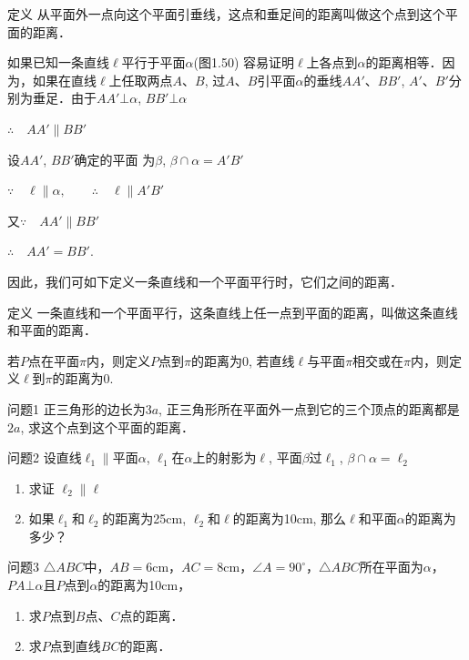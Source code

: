   \begin{blk}
    {定义} 从平面外一点向这个平面引垂线，这点和垂足间的距离叫做这个点到这个平面的距离．
  \end{blk}
  
  如果已知一条直线$\ell$平行于平面$\alpha$(图1.50) 容易证明$\ell$上各点到$\alpha$的距离相等．因为，如果在直线$\ell$上任取两点$A$、$B$, 过$A$、$B$引平面$\alpha$的垂线$AA'$、$BB'$, $A'$、$B'$分别为垂足．由于$AA'\bot\alpha$, $BB'\bot \alpha$
  
  $\therefore\quad AA'\parallel BB'$
  
  设$AA'$, $BB'$确定的平面
  为$\beta$, $\beta\cap\alpha=A'B'$
  
  $\because\quad \ell\parallel \alpha,\qquad \therefore\quad \ell\parallel A'B'$
  
  又$\because\quad AA'\parallel BB'$
  
  $\therefore\quad AA'=BB'$.
  
  因此，我们可如下定义一条直线和一个平面平行时，它们之间的距离．
  
  \begin{blk}
    {定义} 一条直线和一个平面平行，这条直线上任一点到平面的距离，叫做这条直线和平面的距离．
  \end{blk}
  
  若$P$点在平面$\pi$内，则定义$P$点到$\pi$的距离为0, 若直线$\ell$与平面$\pi$相交或在$\pi$内，则定义$\ell$到$\pi$的距离为0.
  
  \begin{blk}
    {问题1} 正三角形的边长为$3a$, 正三角形所在平面外一点到它的三个顶点的距离都是$2a$, 求这个点到这个平面的距离．
  \end{blk}
  
  \begin{blk}
    {问题2} 设直线$\ell_1\parallel$平面$\alpha$, $\ell_1$在$\alpha$上的射影为$\ell$, 平面$\beta$过$\ell_1$, $\beta\cap\alpha=\ell_2$ 
  \begin{enumerate}
    \item 求证 $\ell_2\parallel\ell$
    \item 如果$\ell_1$和$\ell_2$的距离为25cm, $\ell_2$和$\ell$的距离为10cm, 那么$\ell$和平面$\alpha$的距离为多少？
  \end{enumerate}
  \end{blk}
  
  \begin{blk}{问题3} 
    $\triangle ABC$中，$AB=6$cm，$AC=8$cm，$\angle A=90^{\circ}$，$\triangle ABC$所在平面为$\alpha$，$PA\bot \alpha$且$P$点到$\alpha$的距离为10cm，
  \begin{enumerate}
    \item 求$P$点到$B$点、$C$点的距离．
    \item 求$P$点到直线$BC$的距离．
  \end{enumerate}
  \end{blk}
  
